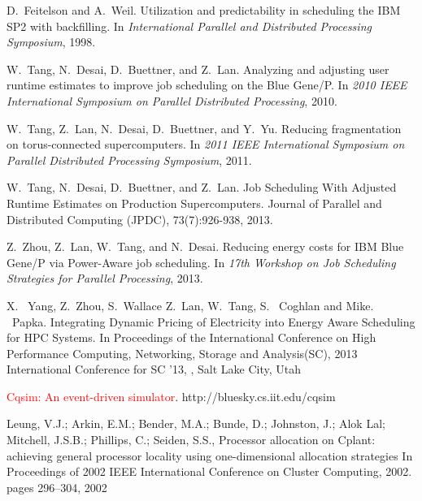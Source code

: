 \documentclass[conference]{IEEEtran}
\begin{document}
\begin{thebibliography}{10}
D.~Feitelson and A.~Weil.
\newblock Utilization and predictability in scheduling the {IBM} {SP2} with
  backfilling.
\newblock In {\em International Parallel and Distributed Processing Symposium}, 1998.

W.~Tang, N.~Desai, D.~Buettner, and Z.~Lan.
\newblock Analyzing and adjusting user runtime estimates to improve job
  scheduling on the {Blue} {Gene/P}.
\newblock In {\em 2010 IEEE International Symposium on Parallel Distributed
  Processing}, 2010.

W.~Tang, Z.~Lan, N.~Desai, D.~Buettner, and Y.~Yu.
\newblock Reducing fragmentation on torus-connected supercomputers.
\newblock In {\em 2011 IEEE International Symposium on Parallel Distributed
  Processing Symposium}, 2011.

W.~Tang, N.~Desai, D.~Buettner, and Z.~Lan. 
\newblock Job Scheduling With Adjusted Runtime Estimates on Production Supercomputers.
\newblock Journal of Parallel and Distributed Computing (JPDC), 73(7):926-938, 2013.

Z.~Zhou, Z.~Lan, W.~Tang, and N.~Desai.
\newblock Reducing energy costs for {IBM Blue} {Gene/P} via {Power-Aware} job
  scheduling.
\newblock In {\em 17th Workshop on Job Scheduling Strategies for Parallel
  Processing}, 2013.

X. ~Yang, Z.~Zhou, S.~Wallace Z.~Lan, W.~Tang, S. ~Coghlan and Mike. ~Papka.
\newblock Integrating Dynamic Pricing of Electricity into Energy Aware Scheduling for HPC Systems. 
\newblock In {Proceedings of the International Conference on High Performance Computing, Networking, Storage and Analysis(SC), 2013 International Conference for}
\newblock SC '13,
,
\newblock Salt Lake City, Utah

{\textcolor{red} {Cqsim: An event-driven simulator}}.
\newblock http://bluesky.cs.iit.edu/cqsim


Leung, V.J.; Arkin, E.M.; Bender, M.A.; Bunde, D.; Johnston, J.; 
Alok Lal; Mitchell, J.S.B.; Phillips, C.; Seiden, S.S., 
\newblock Processor allocation on Cplant: achieving general processor locality using one-dimensional allocation strategies
\newblock In {Proceedings of 2002 IEEE International Conference on Cluster Computing, 2002}.  pages 296--304, 2002


\end{thebibliography}
\end{document}
